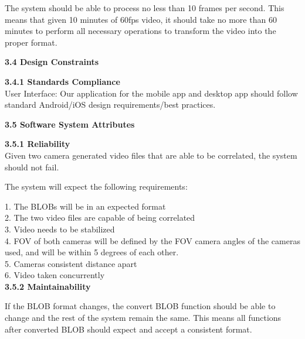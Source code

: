 \documentclass[10pt,draftclsnofoot,onecolumn]{IEEEtran}
\begin{document}
The system should be able to process no less than 10 frames per second. This means that given 10 minutes of 60fps video, it should take no more than 60 minutes to perform all necessary operations to transform the video into the proper format.
  \\\vspace{5mm}

 {\Medium\textbf{3.4 Design Constraints}} \\
   \vspace{5mm}

 {\Medium\textbf{3.4.1 Standards Compliance}} \\
   \vspace{5mm}
   User Interface: Our application for the mobile app and desktop app should follow standard Android/iOS design requirements/best practices.
   \vspace{5mm}

 {\Medium\textbf{3.5 Software System Attributes}} \\
    \vspace{5mm}

 {\Medium\textbf{3.5.1 Reliability}} \\
Given two camera generated video files that are able to be correlated, the system should not fail.\\
 \vspace{2mm}

The system will expect the following requirements:\\
\vspace{2mm}

1. The BLOBs will be in an expected format\\
2. The two video files are capable of being correlated\\
3. Video needs to be stabilized\\
4. FOV of both cameras will be defined by the FOV camera angles of the cameras used, and will be within 5 degrees of each other. \\
5. Cameras consistent distance apart\\
6. Video taken concurrently\\

    \vspace{5mm}
 {\Medium\textbf{3.5.2 Maintainability}} \\
     \vspace{5mm}

If the BLOB format changes, the convert BLOB function should be able to change and the rest of the system remain the same. This means all functions after converted BLOB should expect and accept a consistent format.\\
    \vspace{5mm}
    
\end{document}
